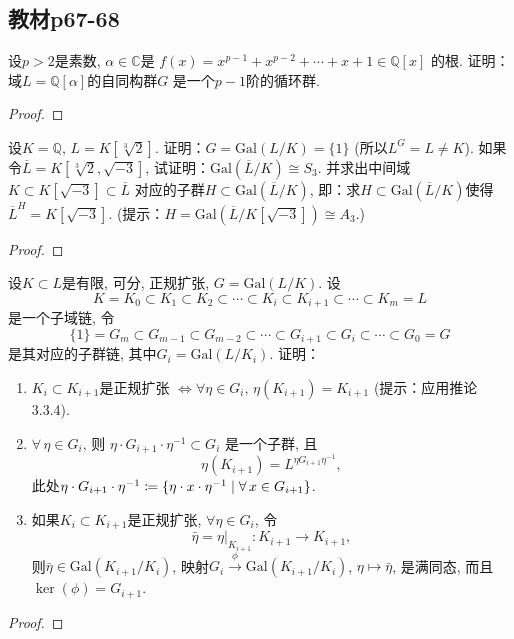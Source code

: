 \subsection{教材p67-68}

\begin{problem}
    设$p > 2$是素数, $\alpha \in \mathbb{C}$是
$f(x) = x^{p - 1} + x^{p - 2} + \cdots + x + 1 \in \mathbb{Q}[x]$
的根. 证明：域$L = \mathbb{Q}[\alpha]$的自同构群$G$
是一个$p - 1$阶的循环群.
\end{problem}

\begin{proof}
    
\end{proof}

\begin{problem}
    设$K = \mathbb{Q},\, L = K[\sqrt[3]{2}]$.
证明：$G = \mathrm{Gal}(L/K)=\{1\}$ (所以$L^G = L \neq K$).
如果令$\overline{L} = K[\sqrt[3]{2}, \sqrt{-3}]$,
试证明：$\mathrm{Gal}(\overline{L}/K) \cong S_3$.
并求出中间域$K \subset K[\sqrt{-3}] \subset \overline{L}$
对应的子群$H \subset \mathrm{Gal}(\overline L/K)$,
即：求$H \subset \mathrm{Gal}(\overline L/K)$使得
$\overline{L}^{H} = K[\sqrt{-3}]$.
(提示：$H = \mathrm{Gal}(\overline L/K[\sqrt{-3}]) \cong A_3$.)
\end{problem}

\begin{proof}
    
\end{proof}

\begin{problem}
    设$K \subset L$是有限, 可分, 正规扩张, $G = \mathrm{Gal}(L/K)$.
设
\[
    K = K_0 \subset K_1 \subset K_2 \subset \cdots \subset K_i \subset K_{i + 1} \subset \cdots \subset K_m = L
\]
是一个子域链, 令
\[
    \{1\} = G_m \subset G_{m - 1} \subset G_{m - 2} \subset \cdots \subset G_{i + 1} \subset G_i \subset \cdots \subset G_0 = G
\]
是其对应的子群链, 其中$G_i = \mathrm{Gal}(L/K_i)$. 证明：
\begin{enumerate}[(1)]
    \item $K_i \subset K_{i + 1}$是正规扩张
$\Leftrightarrow \forall \eta \in G_i,\, \eta(K_{i + 1}) = K_{i + 1}$
(提示：应用推论3.3.4).
    \item $\forall\, \eta \in G_i$, 则
$\eta \cdot G_{i + 1} \cdot \eta^{-1} \subset G_i$
是一个子群, 且
\[
    \eta(K_{i + 1}) = L^{\eta G_{i + 1}\eta^{-1}},
\]
此处$\eta \cdot G_{i + 1} \cdot \eta ^{- 1} \mathrel{\coloneqq} \{\eta \cdot x \cdot \eta^{-1} \mid \forall\, x \in G_{i + 1}\}$.
    \item 如果$K_i \subset K_{i + 1}$是正规扩张, $\forall \eta \in G_i$,
令
\[
    \bar{\eta} = \eta|_{K_{i + 1}}:K_{i + 1} \to K_{i + 1},
\]
则$\bar{\eta} \in \mathrm{Gal}(K_{i + 1}/K_i)$,
映射$G_i \overset{\phi}\to \mathrm{Gal}(K_{i + 1}/K_i)$,
$\eta \mapsto \bar{\eta}$, 是满同态, 而且
$\ker(\phi) = G_{i + 1}$.
\end{enumerate}
\end{problem}

\begin{proof}
    
\end{proof}